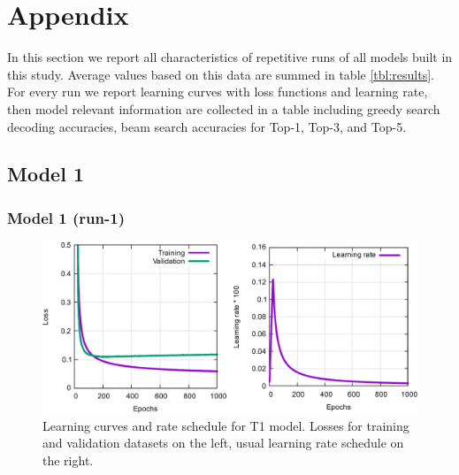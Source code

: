 \documentclass{article}
\begin{document}
  

 
 \newpage
 
\section{Appendix}
\label{sec:appendix}

In this section we report all characteristics of repetitive runs of all models built in this study. Average values based on this data are summed in table \ref{tbl:results}. For every run we report learning curves with loss functions and learning rate, then model relevant information are collected in a table including greedy search decoding accuracies, beam search accuracies for Top-1, Top-3, and Top-5.

\subsection{Model 1} 
\subsubsection{Model 1 (run-1)}
  
\begin{figure}[h!]
  \centering
  \includegraphics[width = 16.5cm]{images/t1-1.pdf}
  \caption{Learning curves and rate schedule for T1 model. Losses for training and validation datasets on the left, usual learning rate schedule on the right.}
  \label{fig:t11}
\end{figure}
\end{document}
